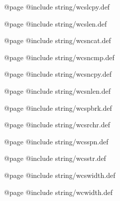 @page
@include string/wcslcpy.def

@page
@include string/wcslen.def

@page
@include string/wcsncat.def

@page
@include string/wcsncmp.def

@page
@include string/wcsncpy.def

@page
@include string/wcsnlen.def

@page
@include string/wcspbrk.def

@page
@include string/wcsrchr.def

@page
@include string/wcsspn.def

@page
@include string/wcsstr.def

@page
@include string/wcswidth.def

@page
@include string/wcwidth.def

